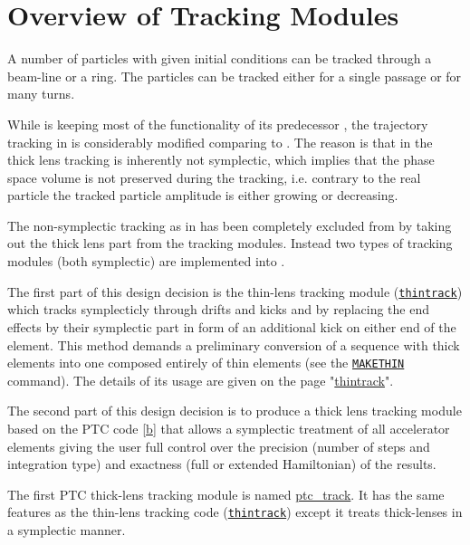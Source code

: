 
\chapter{Overview of \madx Tracking Modules}

A number of particles with given initial conditions can be tracked
through a beam-line or a ring. The particles can be tracked either for a
single passage or for many turns.  


While  is keeping most of the
functionality of  its predecessor \href{http://cern.ch/mad8}{\madeight}, the
trajectory tracking in \madx is considerably modified comparing to
\madeight. 
The reason is that in \madeight the thick lens tracking is inherently not
symplectic, which implies that the phase space volume is not preserved
during the tracking, i.e. contrary to the real particle the tracked
particle amplitude is either growing or decreasing. 


The non-symplectic tracking as in \madeight has been completely excluded
from \madx by taking out the thick lens part from the tracking
modules. Instead two types of tracking modules (both symplectic) are
implemented into \madx. 


The first part of this design decision is the thin-lens tracking module
(\texttt{\href{../thintrack/thintrack.html}{thintrack}})  which tracks
symplecticly through drifts and kicks and by replacing the end effects
by their symplectic part in form of an additional kick on either  end of
the element. This method demands a preliminary conversion of a sequence
with thick elements into one composed entirely of thin elements (see the
\texttt{\href{../makethin/makethin.html}{MAKETHIN}} command). The
details of its usage are given on the page
"\href{../thintrack/thintrack.html}{thintrack}". 


The second part of this design decision is to produce a thick lens
tracking module based on the PTC code [\hyperlink{E._Forest}{b}] that
allows a symplectic treatment of all accelerator elements giving the
user full control over the precision (number of steps and integration
type) and exactness (full or extended Hamiltonian) of the results. 


The first PTC thick-lens tracking module is named
\href{../ptc_track/ptc_track.html}{ptc\_track}. It has the same features
as the thin-lens tracking code
(\texttt{\href{../thintrack/thintrack.html}{thintrack}}) except it
treats thick-lenses in a symplectic manner. 


